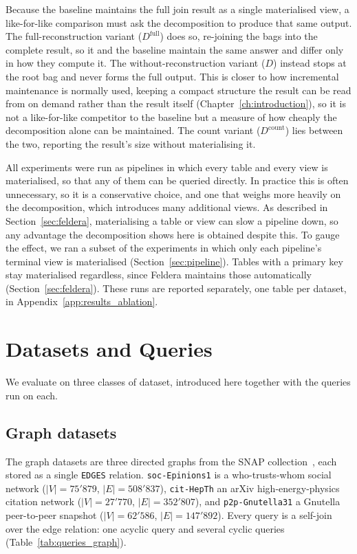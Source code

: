 Because the baseline maintains the full join result as a single materialised view, a like-for-like comparison must ask the decomposition to produce that same output. The full-reconstruction variant ($D^{\text{full}}$) does so, re-joining the bags into the complete result, so it and the baseline maintain the same answer and differ only in how they compute it. The without-reconstruction variant ($D$) instead stops at the root bag and never forms the full output. This is closer to how incremental maintenance is normally used, keeping a compact structure the result can be read from on demand rather than the result itself (Chapter~\ref{ch:introduction}), so it is not a like-for-like competitor to the baseline but a measure of how cheaply the decomposition alone can be maintained. The count variant ($D^{\text{count}}$) lies between the two, reporting the result's size without materialising it.

\medskip
All experiments were run as pipelines in which every table and every view is materialised, so that any of them can be queried directly. In practice this is often unnecessary, so it is a conservative choice, and one that weighs more heavily on the decomposition, which introduces many additional views. As described in Section~\ref{sec:feldera}, materialising a table or view can slow a pipeline down, so any advantage the decomposition shows here is obtained despite this. To gauge the effect, we ran a subset of the experiments in which only each pipeline's terminal view is materialised (Section~\ref{sec:pipeline}). Tables with a primary key stay materialised regardless, since Feldera maintains those automatically (Section~\ref{sec:feldera}). These runs are reported separately, one table per dataset, in Appendix~\ref{app:results_ablation}.

\section{Datasets and Queries}
\label{sec:datasets}

We evaluate on three classes of dataset, introduced here together with the queries run on each.

\subsection{Graph datasets}
The graph datasets are three directed graphs from the SNAP collection~\cite{snapnets}, each stored as a single \texttt{EDGES} relation. \texttt{soc-Epinions1} is a who-trusts-whom social network ($|V| = 75'879$, $|E| = 508'837$), \texttt{cit-HepTh} an arXiv high-energy-physics citation network ($|V| = 27'770$, $|E| = 352'807$), and \texttt{p2p-Gnutella31} a Gnutella peer-to-peer snapshot ($|V| = 62'586$, $|E| = 147'892$). Every query is a self-join over the edge relation: one acyclic query and several cyclic queries (Table~\ref{tab:queries_graph}).

